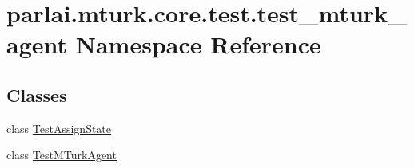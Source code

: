 \hypertarget{namespaceparlai_1_1mturk_1_1core_1_1test_1_1test__mturk__agent}{}\section{parlai.\+mturk.\+core.\+test.\+test\+\_\+mturk\+\_\+agent Namespace Reference}
\label{namespaceparlai_1_1mturk_1_1core_1_1test_1_1test__mturk__agent}
\subsection*{Classes}
\begin{DoxyCompactItemize}
\item 
class \hyperlink{classparlai_1_1mturk_1_1core_1_1test_1_1test__mturk__agent_1_1TestAssignState}{Test\+Assign\+State}
\item 
class \hyperlink{classparlai_1_1mturk_1_1core_1_1test_1_1test__mturk__agent_1_1TestMTurkAgent}{Test\+M\+Turk\+Agent}
\end{DoxyCompactItemize}
